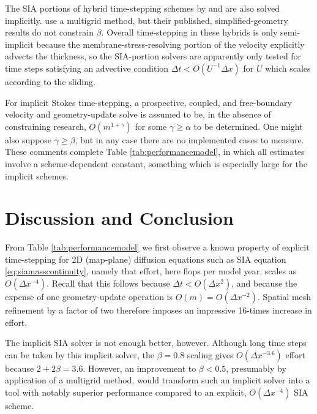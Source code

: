 \documentclass[review,letterpaper]{igs}
\begin{document}
The SIA portions of hybrid time-stepping schemes by \cite{JouvetGraeser2013} and \cite{BrinkerhoffJohnson2015} are also solved implicitly.  \cite{JouvetGraeser2013} use a multigrid method, but their published, simplified-geometry results do not constrain $\beta$.  Overall time-stepping in these hybrids is only semi-implicit because the membrane-stress-resolving portion of the velocity explicitly advects the thickness, so the SIA-portion solvers are apparently only tested for time steps satisfying an advective condition $\Delta t < O(U^{-1}\Delta x)$ for $U$ which scales according to the sliding.

For implicit Stokes time-stepping, a prospective, coupled, and free-boundary velocity and geometry-update solve is assumed to be, in the absence of constraining research, $O(m^{1+\gamma})$ for some $\gamma \ge \alpha$ to be determined.  One might also suppose $\gamma\ge \beta$, but in any case there are no implemented cases to measure.  These comments complete Table \ref{tab:performancemodel}, in which all estimates involve a scheme-dependent constant, something which is especially large for the implicit schemes.



\section{Discussion and Conclusion}

From Table \ref{tab:performancemodel} we first observe a known property of explicit time-stepping for 2D (map-plane) diffusion equations such as SIA equation \eqref{eq:siamasscontinuity}, namely that effort, here flops per model year, scales as $O(\Delta x^{-4})$.  Recall that this follows because $\Delta t < O(\Delta x^2)$, and because the expense of one geometry-update operation is $O(m) = O(\Delta x^{-2})$.  Spatial mesh refinement by a factor of two therefore imposes an impressive 16-times increase in effort.

The \cite{Bueler2016} implicit SIA solver is not enough better, however.  Although long time steps can be taken by this implicit solver, the $\beta=0.8$ scaling gives $O(\Delta x^{-3.6})$ effort because $2+2\beta=3.6$.  However, an improvement to $\beta < 0.5$, presumably by application of a multigrid method, would transform such an implicit solver into a tool with notably superior performance compared to an explicit, $O(\Delta x^{-4})$ SIA scheme.
\end{document}
